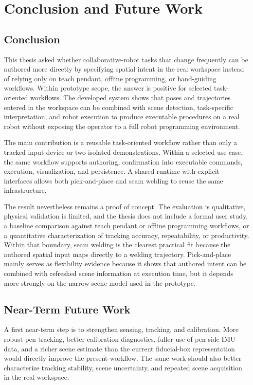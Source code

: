 \chapter{Conclusion and Future Work} \label{chapter:ch7_conclusion}

\section{Conclusion}

This thesis asked whether collaborative-robot tasks that change frequently can be authored more directly by specifying spatial intent in the real workspace instead of relying only on teach pendant, offline programming, or hand-guiding workflows. Within prototype scope, the answer is positive for selected task-oriented workflows. The developed system shows that poses and trajectories entered in the workspace can be combined with scene detection, task-specific interpretation, and robot execution to produce executable procedures on a real robot without exposing the operator to a full robot programming environment.

The main contribution is a reusable task-oriented workflow rather than only a tracked input device or two isolated demonstrations. Within a selected use case, the same workflow supports authoring, confirmation into executable commands, execution, visualization, and persistence. A shared runtime with explicit interfaces allows both pick-and-place and seam welding to reuse the same infrastructure.

The result nevertheless remains a proof of concept. The evaluation is qualitative, physical validation is limited, and the thesis does not include a formal user study, a baseline comparison against teach pendant or offline programming workflows, or a quantitative characterization of tracking accuracy, repeatability, or productivity. Within that boundary, seam welding is the clearest practical fit because the authored spatial input maps directly to a welding trajectory. Pick-and-place mainly serves as flexibility evidence because it shows that authored intent can be combined with refreshed scene information at execution time, but it depends more strongly on the narrow scene model used in the prototype.

\section{Near-Term Future Work}

A first near-term step is to strengthen sensing, tracking, and calibration. More robust pen tracking, better calibration diagnostics, fuller use of pen-side IMU data, and a richer scene estimate than the current fiducial-box representation would directly improve the present workflow. The same work should also better characterize tracking stability, scene uncertainty, and repeated scene acquisition in the real workspace.

